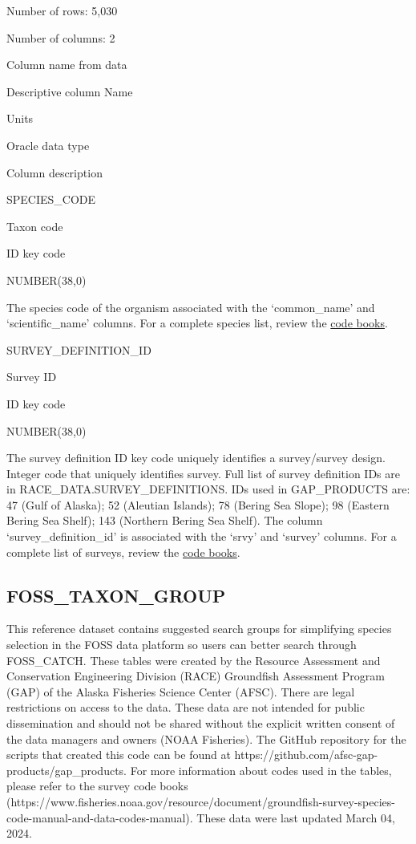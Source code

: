 \documentclass[
  letterpaper,
  oneside,
  open=any]{scrbook}
\begin{document}
Number of rows: 5,030

Number of columns: 2

Column name from data

Descriptive column Name

Units

Oracle data type

Column description

SPECIES\_CODE

Taxon code

ID key code

NUMBER(38,0)

The species code of the organism associated with the `common\_name' and
`scientific\_name' columns. For a complete species list, review the
\href{https://www.fisheries.noaa.gov/resource/document/groundfish-survey-species-code-manual-and-data-codes-manual}{code
books}.

SURVEY\_DEFINITION\_ID

Survey ID

ID key code

NUMBER(38,0)

The survey definition ID key code uniquely identifies a survey/survey
design. Integer code that uniquely identifies survey. Full list of
survey definition IDs are in RACE\_DATA.SURVEY\_DEFINITIONS. IDs used in
GAP\_PRODUCTS are: 47 (Gulf of Alaska); 52 (Aleutian Islands); 78
(Bering Sea Slope); 98 (Eastern Bering Sea Shelf); 143 (Northern Bering
Sea Shelf). The column `survey\_definition\_id' is associated with the
`srvy' and `survey' columns. For a complete list of surveys, review the
\href{https://www.fisheries.noaa.gov/resource/document/groundfish-survey-species-code-manual-and-data-codes-manual}{code
books}.

\hypertarget{foss_taxon_group}{%
\subsection{FOSS\_TAXON\_GROUP}\label{foss_taxon_group}}

This reference dataset contains suggested search groups for simplifying
species selection in the FOSS data platform so users can better search
through FOSS\_CATCH. These tables were created by the Resource
Assessment and Conservation Engineering Division (RACE) Groundfish
Assessment Program (GAP) of the Alaska Fisheries Science Center (AFSC).
There are legal restrictions on access to the data. These data are not
intended for public dissemination and should not be shared without the
explicit written consent of the data managers and owners (NOAA
Fisheries). The GitHub repository for the scripts that created this code
can be found at https://github.com/afsc-gap-products/gap\_products. For
more information about codes used in the tables, please refer to the
survey code books
(https://www.fisheries.noaa.gov/resource/document/groundfish-survey-species-code-manual-and-data-codes-manual).
These data were last updated March 04, 2024.
\end{document}
